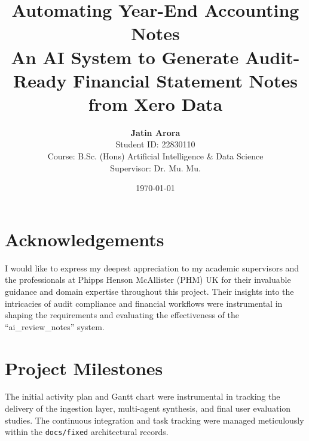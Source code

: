 \documentclass[12pt,a4paper]{report}
\title{
    \vspace{2cm}
    \textbf{Automating Year-End Accounting Notes}\\
    \Large An AI System to Generate Audit-Ready Financial Statement Notes from Xero Data
}
\author{
    \textbf{Jatin Arora}\\
    Student ID: 22830110\\
    Course: B.Sc. (Hons) Artificial Intelligence \& Data Science\\
    Supervisor: Dr. Mu. Mu.
}
\date{\today}
\begin{document}
\maketitle
{}



\chapter*{Acknowledgements}
I would like to express my deepest appreciation to my academic supervisors and the professionals at Phipps Henson McAllister (PHM) UK for their invaluable guidance and domain expertise throughout this project. Their insights into the intricacies of audit compliance and financial workflows were instrumental in shaping the requirements and evaluating the effectiveness of the ``ai\_review\_notes'' system.

\tableofcontents
\listoffigures
\listoftables

\clearpage
{}










\renewcommand{\bibname}{References}

\nocite{*}


\appendix
\chapter{Project Milestones}
The initial activity plan and Gantt chart were instrumental in tracking the delivery of the ingestion layer, multi-agent synthesis, and final user evaluation studies. The continuous integration and task tracking were managed meticulously within the \texttt{docs/fixed} architectural records.



\end{document}

